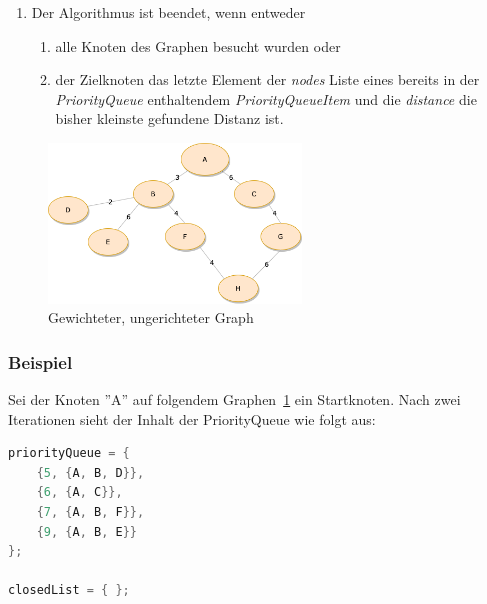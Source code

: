 \documentclass[a4paper]{article}
\begin{document}
\begin{enumerate}
    \item Der Algorithmus ist beendet, wenn entweder
    \begin{enumerate}
        \item alle Knoten des Graphen besucht wurden oder
        \item der Zielknoten das letzte Element der \textit{nodes} Liste eines bereits in der \textit{PriorityQueue} enthaltendem \textit{PriorityQueueItem} und die \textit{distance} die bisher kleinste gefundene Distanz ist.
    \end{enumerate}
\end{enumerate}

\begin{figure}[htbp]
	\centering
		\includegraphics[width=0.60\textwidth]{Figs/Beispielgraph_2.png}		
	\caption{Gewichteter, ungerichteter Graph}
	\label{fig:beispielgraph_2}
\end{figure}

\subsubsection{Beispiel}

Sei der Knoten ''A'' auf folgendem Graphen~\ref{fig:beispielgraph_2} ein Startknoten.
Nach zwei Iterationen sieht der Inhalt der PriorityQueue wie folgt aus:\\

\begin{lstlisting}[language = java, frame = trBL]
priorityQueue = {
    {5, {A, B, D}},
    {6, {A, C}},
    {7, {A, B, F}},
    {9, {A, B, E}}
};

closedList = { };
\end{lstlisting}
\end{document}
